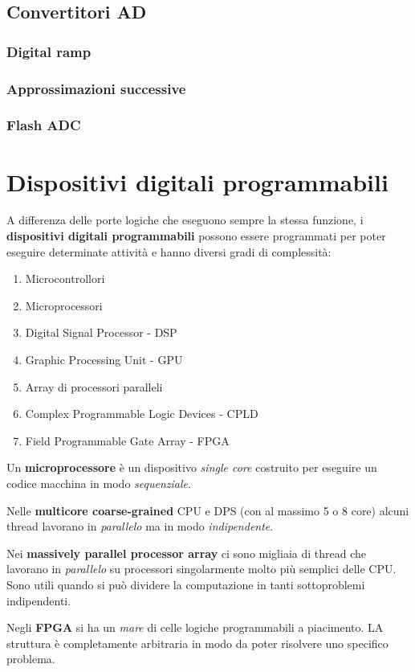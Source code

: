 \documentclass[12pt, a4paper]{report}
\begin{document}
\section{Convertitori AD}
\subsection{Digital ramp}
\subsection{Approssimazioni successive}
\subsection{Flash ADC}

\chapter{Dispositivi digitali programmabili}
A differenza delle porte logiche che eseguono sempre la stessa funzione, i \textbf{dispositivi digitali programmabili} possono essere programmati per poter eseguire determinate attività e hanno diversi gradi di complessità:
\begin{enumerate}
    \item Microcontrollori
    \item Microprocessori
    \item Digital Signal Processor - DSP
    \item Graphic Processing Unit - GPU
    \item Array di processori paralleli
    \item Complex Programmable Logic Devices - CPLD
    \item Field Programmable Gate Array - FPGA
\end{enumerate}
Un \textbf{microprocessore} è un dispositivo \textit{single core} costruito per eseguire un codice macchina in modo \textit{sequenziale}.

Nelle \textbf{multicore coarse-grained} CPU e DPS (con al massimo 5 o 8 core) alcuni thread lavorano in \textit{parallelo} ma in modo \textit{indipendente}.

Nei \textbf{massively parallel processor array} ci sono migliaia di thread che lavorano in \textit{parallelo} su processori singolarmente molto più semplici delle CPU. Sono utili quando si può dividere la computazione in tanti sottoproblemi indipendenti.

Negli \textbf{FPGA} si ha un \textit{mare} di celle logiche programmabili a piacimento. LA struttura è completamente arbitraria in modo da poter risolvere uno specifico problema.
\end{document}
